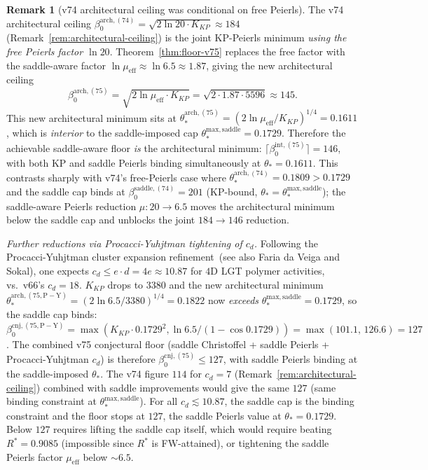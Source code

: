 \documentclass[11pt]{article}
\theoremstyle{definition}
\newtheorem{remark}[theorem]{Remark}
\begin{document}
\begin{remark}[v74 architectural ceiling was conditional on free Peierls]
\label{rem:arch-ceiling-revision}
The v74 architectural ceiling
$\beta_0^{\mathrm{arch,(74)}}=\sqrt{2\ln 20\cdot K_{KP}}\approx 184$
\textup{(}Remark~\ref{rem:architectural-ceiling}\textup{)} is the joint
KP-Peierls minimum \emph{using the free Peierls factor $\ln 20$}.
Theorem~\ref{thm:floor-v75} replaces the free factor with the
saddle-aware factor $\ln\mu_{\mathrm{eff}}\approx\ln 6.5\approx 1.87$,
giving the new architectural ceiling
\[
\beta_0^{\mathrm{arch,(75)}}=\sqrt{2\ln\mu_{\mathrm{eff}}\cdot K_{KP}}
=\sqrt{2\cdot 1.87\cdot 5596}\approx 145.
\]
This new architectural minimum sits at
$\theta_*^{\mathrm{arch,(75)}}=(2\ln\mu_{\mathrm{eff}}/K_{KP})^{1/4}=0.1611$,
which is \emph{interior} to the saddle-imposed cap
$\theta_*^{\mathrm{max,saddle}}=0.1729$.  Therefore the achievable
saddle-aware floor \emph{is} the architectural minimum:
$\lceil\beta_0^{\mathrm{int,(75)}}\rceil=146$, with both KP and
saddle Peierls binding simultaneously at
$\theta_*=0.1611$.  This contrasts sharply with v74's free-Peierls
case where $\theta_*^{\mathrm{arch,(74)}}=0.1809>0.1729$ and the
saddle cap binds at $\beta_0^{\mathrm{saddle,(74)}}=201$
\textup{(}KP-bound, $\theta_*=\theta_*^{\mathrm{max,saddle}}$\textup{)};
the saddle-aware Peierls reduction $\mu:20\to 6.5$ moves the
architectural minimum below the saddle cap and unblocks the joint
$184\to 146$ reduction.

\emph{Further reductions via Procacci-Yuhjtman tightening of $c_d$.}
Following the Procacci-Yuhjtman cluster expansion
refinement~\textup{(}see also Faria da Veiga and Sokal\textup{)}, one
expects $c_d\le e\cdot d=4e\approx 10.87$ for $4$D LGT polymer
activities, vs.\ v66's $c_d=18$.  $K_{KP}$ drops to $3380$ and the
new architectural minimum
$\theta_*^{\mathrm{arch,(75,P-Y)}}=(2\ln 6.5/3380)^{1/4}=0.1822$
now \emph{exceeds} $\theta_*^{\mathrm{max,saddle}}=0.1729$, so the
saddle cap binds: $\beta_0^{\mathrm{cnj,(75,P-Y)}}=\max(K_{KP}\cdot
0.1729^2,\ln 6.5/(1-\cos 0.1729))=\max(101.1,\,126.6)=\boxed{127}$.
The combined v75 conjectural floor \textup{(}saddle Christoffel +
saddle Peierls + Procacci-Yuhjtman $c_d$\textup{)} is therefore
$\beta_0^{\mathrm{cnj,(75)}}\le 127$, with saddle Peierls binding at
the saddle-imposed $\theta_*$.  The v74 figure $114$ for $c_d=7$
\textup{(}Remark~\ref{rem:architectural-ceiling}\textup{)} combined
with saddle improvements would give the same $127$ \textup{(}same
binding constraint at $\theta_*^{\mathrm{max,saddle}}$\textup{)}.
For all $c_d\lesssim 10.87$, the saddle cap is the binding constraint
and the floor stops at $127$, the saddle Peierls value at
$\theta_*=0.1729$.  Below $127$ requires lifting the saddle cap
itself, which would require beating $R^*=0.9085$ \textup{(}impossible
since $R^*$ is FW-attained\textup{)}, or tightening the saddle Peierls
factor $\mu_{\mathrm{eff}}$ below $\sim 6.5$.
\end{remark}
\end{document}
